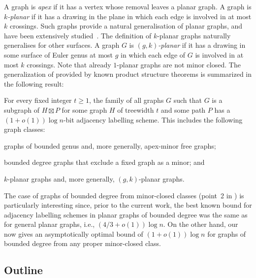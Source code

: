 \documentclass[kpfonts]{patmorin}
\let\geq\geqslant
\begin{document}
A graph is \emph{apex} if it has a vertex whose removal leaves a planar graph.
A graph is \emph{$k$-planar} if it has a drawing in the plane in which
each edge is involved in at most $k$ crossings. Such graphs provide a natural
generalisation of planar graphs, and have been extensively studied~\cite{kobourov.liotta.ea:annotated}.
The definition of $k$-planar graphs naturally generalises for other surfaces. A graph $G$ is
\emph{$(g,k)$-planar} if it has a drawing in some surface of Euler genus at most
$g$ in which each edge of $G$ is involved in at most $k$ crossings.
Note that already $1$-planar graphs are not minor closed.
The generalization of  provided by known product structure theorems is summarized in the following result:

\begin{thm}
  For every fixed integer $t\geq 1$, the family of all graphs $G$ such that $G$ is a subgraph of $H\boxtimes P$ for some graph $H$ of treewidth $t$ and some path $P$ has a $(1+o(1))\log n$-bit adjacency labelling scheme.
  This includes the following graph classes:
  \begin{compactenum}
    \item graphs of bounded genus and, more generally, apex-minor free graphs;
    \item bounded degree graphs that exclude a fixed graph as a minor; and
    \item $k$-planar graphs and, more generally, $(g,k)$-planar graphs.
  \end{compactenum}
\end{thm}

The case of graphs of bounded degree from minor-closed classes (point~2 in ) is particularly interesting since, prior to the current work, the best known bound for adjacency labelling schemes in planar graphs of bounded degree was the same as for general planar graphs, i.e., $(4/3+o(1))\log n$. On the other hand, our  now gives an asymptotically optimal bound of $(1+o(1))\log n$ for graphs of bounded degree from any proper minor-closed class.




\subsection{Outline}
\end{document}
